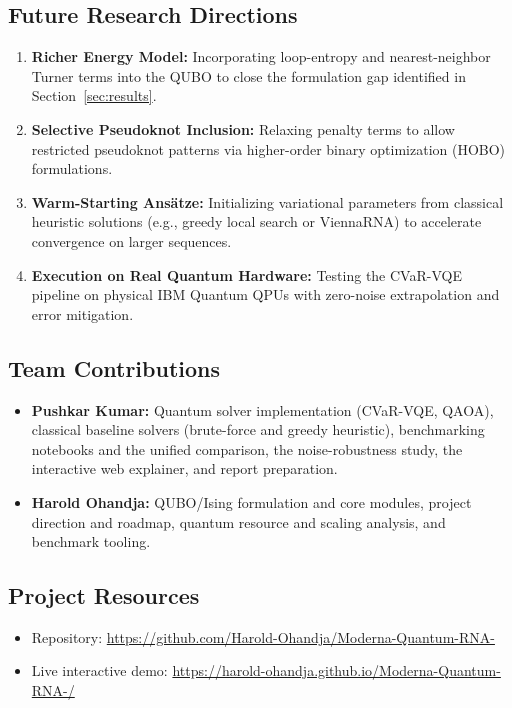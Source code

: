 \documentclass[11pt,a4paper]{article}
\begin{document}
	\subsection{Future Research Directions}
	\begin{enumerate}[leftmargin=1.2cm]
		\item \textbf{Richer Energy Model:} Incorporating loop-entropy and nearest-neighbor Turner terms into the QUBO to close the formulation gap identified in Section~\ref{sec:results}.
		\item \textbf{Selective Pseudoknot Inclusion:} Relaxing penalty terms to allow restricted pseudoknot patterns via higher-order binary optimization (HOBO) formulations.
		\item \textbf{Warm-Starting Ansätze:} Initializing variational parameters from classical heuristic solutions (e.g., greedy local search or ViennaRNA) to accelerate convergence on larger sequences.
		\item \textbf{Execution on Real Quantum Hardware:} Testing the CVaR-VQE pipeline on physical IBM Quantum QPUs with zero-noise extrapolation and error mitigation.
	\end{enumerate}
	
	\subsection{Team Contributions}
	\begin{itemize}[leftmargin=1.2cm]
		\item \textbf{Pushkar Kumar:} Quantum solver implementation (CVaR-VQE, QAOA), classical baseline solvers (brute-force and greedy heuristic), benchmarking notebooks and the unified comparison, the noise-robustness study, the interactive web explainer, and report preparation.
		\item \textbf{Harold Ohandja:} QUBO/Ising formulation and core modules, project direction and roadmap, quantum resource and scaling analysis, and benchmark tooling.
	\end{itemize}
	
	\subsection*{Project Resources}
	\begin{itemize}[leftmargin=1.2cm]
		\item Repository: \url{https://github.com/Harold-Ohandja/Moderna-Quantum-RNA-}
		\item Live interactive demo: \url{https://harold-ohandja.github.io/Moderna-Quantum-RNA-/}
	\end{itemize}
	
\end{document}
